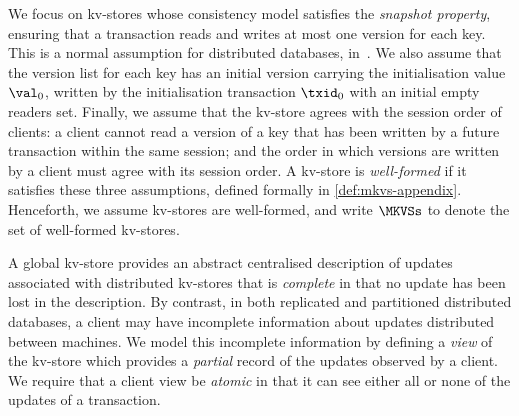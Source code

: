 We focus on kv-stores whose consistency model satisfies the
\emph{snapshot property}, ensuring that
a transaction reads and writes at most one version for each key.
This is a normal assumption for distributed databases, \eg in~\cite{ramp,rola,cops,wren,redblue,PSI,NMSI,gdur,clocksi,distrsi}.
We also assume that 
the version list for each key has an initial version 
carrying the initialisation value $\val_0$,  written by the 
initialisation transaction $\txid_0$ with an initial empty readers set.
Finally, we assume that the kv-store agrees with the session order of clients: 
a client cannot read a
version of a key that has been written by a future transaction within
the same session; and the order in which versions are written by a
client must agree with its session order.  A kv-store is
\emph{well-formed} if it satisfies these three assumptions, defined
formally in \cref{def:mkvs-appendix}.  Henceforth, we assume kv-stores
are well-formed, and write $\MKVSs$ to denote the set of well-formed
kv-stores.

A global kv-store provides an abstract centralised description of
updates associated with distributed kv-stores that is \emph{complete} in 
that no update has been lost in the description. By contrast, in
both replicated and partitioned distributed databases, a client may
have incomplete information about updates distributed between
machines.  We model this incomplete information by
defining a {\em view} of the kv-store which provides a {\em
  partial} record of the updates observed by a client. We require that a client view be {\em atomic} in that it can
see either all or none of the updates of a transaction.



